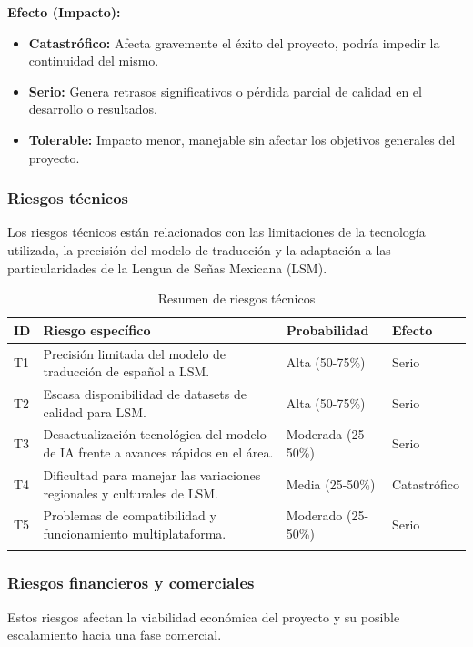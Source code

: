 \textbf{Efecto (Impacto):}
\begin{itemize}
	\item \textbf{Catastrófico:} Afecta gravemente el éxito del proyecto, podría impedir la continuidad del mismo.
	\item \textbf{Serio:} Genera retrasos significativos o pérdida parcial de calidad en el desarrollo o resultados.
	\item \textbf{Tolerable:} Impacto menor, manejable sin afectar los objetivos generales del proyecto.
\end{itemize}


\subsubsection{Riesgos técnicos}
Los riesgos técnicos están relacionados con las limitaciones de la tecnología utilizada, la precisión del modelo de traducción y la adaptación a las particularidades de la Lengua de Señas Mexicana (LSM).

\setlength{\tabcolsep}{4pt}
\renewcommand{\arraystretch}{1.2}

\begin{longtable}{|>{\centering\arraybackslash}p{0.8cm}|>{\raggedright\arraybackslash}p{3.5cm}|>{\raggedright\arraybackslash}p{5.1cm}|>{\raggedright\arraybackslash}p{5.1cm}|}
	\hline
	\textbf{ID} & \textbf{Riesgo específico} & \textbf{Probabilidad} & \textbf{Efecto} \\
	\hline
	T1 & Precisión limitada del modelo de traducción de español a LSM. & Alta (50-75\%) & Serio \\
	\hline
	T2 & Escasa disponibilidad de datasets de calidad para LSM. & Alta (50-75\%) & Serio \\
	\hline
	T3 & Desactualización tecnológica del modelo de IA frente a avances rápidos en el área. & Moderada (25-50\%) & Serio \\
	\hline
	T4 & Dificultad para manejar las variaciones regionales y culturales de LSM. & Media (25-50\%) & Catastrófico \\
	\hline
	T5 & Problemas de compatibilidad y funcionamiento multiplataforma. & Moderado (25-50\%) & Serio \\
	\hline
\caption{Resumen de riesgos técnicos} 
\label{tab:riesgos_tecnicos_resumen}
\end{longtable}

\subsubsection{Riesgos financieros y comerciales}
Estos riesgos afectan la viabilidad económica del proyecto y su posible escalamiento hacia una fase comercial.


